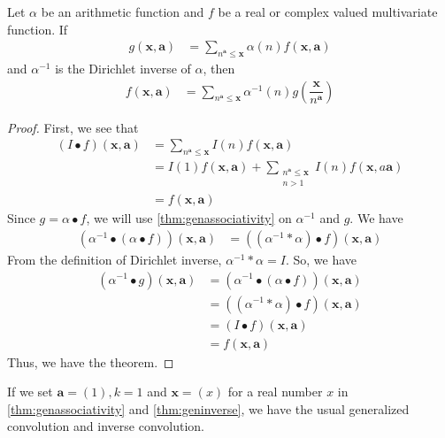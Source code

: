 \documentclass[elemannt.tex]{subfile}
\begin{document}
		\begin{theorem}\label{thm:geninverse}
			Let $\alpha$ be an arithmetic function and $f$ be a real or complex valued multivariate function. If
				\begin{align*}
					g(\mathbf{x}, \mathbf{a})
						& = \sum_{n^{\mathbf{a}}\leq\mathbf{x}}\alpha(n)f(\mathbf{x}, \mathbf{a})
				\end{align*}
			and $\alpha^{-1}$ is the Dirichlet inverse of $\alpha$, then
				\begin{align*}
					f(\mathbf{x}, \mathbf{a})
						& = \sum_{n^{\mathbf{a}}\leq\mathbf{x}}\alpha^{-1}(n)g\left(\dfrac{\mathbf{x}}{n^{\mathbf{a}}}\right)
				\end{align*}
			
				\begin{proof}
					First, we see that
						\begin{align*}
							(I\bullet f)(\mathbf{x},\mathbf{a})
								& = \sum_{n^{\mathbf{a}}\leq\mathbf{x}}I(n)f(\mathbf{x},\mathbf{a})\\
								& = I(1)f(\mathbf{x},\mathbf{a})+\sum_{\substack{n^{\mathbf{a}}\leq{\mathbf{x}}\\n>1}}I(n)f(\mathbf{x},a\mathbf{a})\\
								& = f(\mathbf{x},\mathbf{a})
						\end{align*}
					Since $g=\alpha\bullet f$, we will use \autoref{thm:genassociativity} on $\alpha^{-1}$ and $g$. We have
						\begin{align*}
							(\alpha^{-1}\bullet(\alpha\bullet f))(\mathbf{x},\mathbf{a})
								& = ((\alpha^{-1}\ast\alpha)\bullet f)(\mathbf{x},\mathbf{a})
						\end{align*}
					From the definition of Dirichlet inverse, $\alpha^{-1}\ast\alpha=I$. So, we have
						\begin{align*}
							(\alpha^{-1}\bullet g)(\mathbf{x},\mathbf{a})
								& = (\alpha^{-1}\bullet(\alpha\bullet f))(\mathbf{x},\mathbf{a})\\
								& = ((\alpha^{-1}\ast\alpha)\bullet f)(\mathbf{x}, \mathbf{a})\\
								& = (I\bullet f)(\mathbf{x},\mathbf{a})\\
								& = f(\mathbf{x},\mathbf{a})
						\end{align*}
					Thus, we have the theorem.
				\end{proof}
		\end{theorem}
	If we set $\mathbf{a}=(1),k=1$ and $\mathbf{x}=(x)$ for a real number $x$ in \autoref{thm:genassociativity} and \autoref{thm:geninverse}, we have the usual generalized convolution and inverse convolution.
\end{document}
